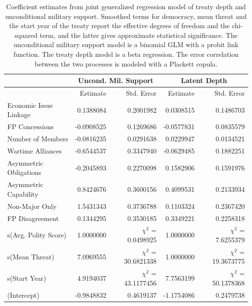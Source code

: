 \documentclass[12pt]{article}
\begin{document}
\begin{table}[ht]
\centering
\begin{tabular}{lrrrr}
  & \multicolumn{2}{c}{Uncond. Mil. Support} & \multicolumn{2}{c}{Latent Depth}\\ \hline
   & Estimate & Std. Error & Estimate & Std. Error \\ 
  \hline
  Economic Issue Linkage & 0.1388084 & 0.2001982 & 0.0308515 & 0.1486703 \\ 
  FP Concessions & -0.0908525 & 0.1269686 & -0.0577831 & 0.0835579 \\ 
  Number of Members & -0.0816235 & 0.0291638 & 0.0229947 & 0.0134521 \\ 
  Wartime Alliances & -0.6544537 & 0.3347940 & -0.0629485 & 0.1882251 \\ 
  Asymmetric Obligations & -0.2045893 & 0.2270098 & 0.1582906 & 0.1591976 \\ 
  Asymmetric Capability & 0.8424676 & 0.3600156 & 0.4099531 & 0.2133934 \\ 
  Non-Major Only & 1.5431343 & 0.3736788 & 0.1103324 & 0.2367420 \\ 
  FP Disagreement & 0.1344295 & 0.3530185 & 0.3349221 & 0.2258318 \\ 
  s(Avg. Polity Score) & 1.0000000 & $\chi^2$ = 0.0498925 & 1.0000000 & $\chi^2$ = 7.6255379 \\ 
  s(Mean Threat) & 7.0969555 & $\chi^2$ = 30.6821338 & 1.0000000 & $\chi^2$ = 19.3673775 \\ 
  s(Start Year) & 4.9194037 & $\chi^2$ = 43.1177456 & 7.7563199 & $\chi^2$ = 50.1378368 \\ 
  (Intercept) & -0.9848832 & 0.4619137 & -1.1754086 & 0.2479738 \\ 
   \hline
\end{tabular}
\caption{Coefficient estimates from joint generalized regression model of treaty depth and unconditional military support. 
          Smoothed terms for democracy, mean threat and the start year of the treaty report the effective degrees of freedom and the chi-squared term, and the latter gives approximate statistical significance.  
                     The unconditional military support model is a binomial GLM with a probit link function. 
                     The treaty depth model is a beta regression. 
                     The error correlation between the two processes is modeled with a Plackett copula.} 
\label{tab:gjrm-res}
\end{table}
\end{document}
